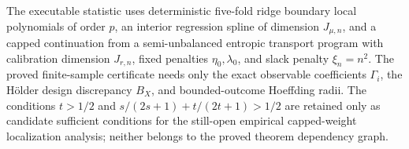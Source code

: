 The executable statistic uses deterministic five-fold ridge boundary local polynomials of order \(p\), an interior regression spline of dimension \(J_{\mu,n}\), and a capped continuation from a semi-unbalanced entropic transport program with calibration dimension \(J_{r,n}\), fixed penalties \(\eta_0,\lambda_0\), and slack penalty \(\xi_n=n^2\). The proved finite-sample certificate needs only the exact observable coefficients \(\Gamma_i\), the Hölder design discrepancy \(B_X\), and bounded-outcome Hoeffding radii. The conditions \(t>1/2\) and \(s/(2s+1)+t/(2t+1)>1/2\) are retained only as candidate sufficient conditions for the still-open empirical capped-weight localization analysis; neither belongs to the proved theorem dependency graph.